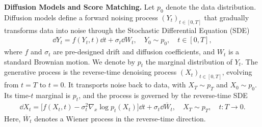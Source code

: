 \begin{table}[t]
\centering
\caption{\small Doob Policy Optimization}
\label{tab:unified_framework}
\end{table}




\textbf{Diffusion Models and Score Matching.}
Let $p_0$ denote the data distribution.
Diffusion models define a forward noising process
$(Y_t)_{t \in [0,T]}$ that gradually transforms data
into noise through the Stochastic Differential Equation
(SDE) \cite{song2020score}
\begin{align}
\label{eq:forward_sde}
    \dd Y_t
    =
    f(Y_t,t)\dd t
    +
    \sigma_t\dd W_t,
    \quad
    Y_0 \sim p_0,
    \quad
    t \in [0,T],
\end{align}
where $f$ and $\sigma_t$ are pre-designed drift and
diffusion coefficients, and $W_t$ is a standard
Brownian motion.
We denote by $p_t$ the marginal distribution of $Y_t$.
The generative process is the reverse-time denoising
process $(X_t)_{t \in [0,T]}$, evolving from $t=T$
to $t=0$.
It transports noise back to data, with
$X_T \sim p_T$ and $X_0 \sim p_0$.
Its time-$t$ marginal is $p_t$, and the process
is governed by the reverse-time SDE
\begin{align}
\label{eq:reverse_sde}
    \dd X_t
    =
    \bigl[
        f(X_t,t)
        -
        \sigma_t^2 \nabla_x \log p_t(X_t)
    \bigr]\dd t
    +
    \sigma_t \dd \overline W_t,
    \quad
    X_T \sim p_T,
    \quad
    t:T \to 0.
\end{align}
Here, $\overline W_t$ denotes a Wiener process in
the reverse-time direction.

